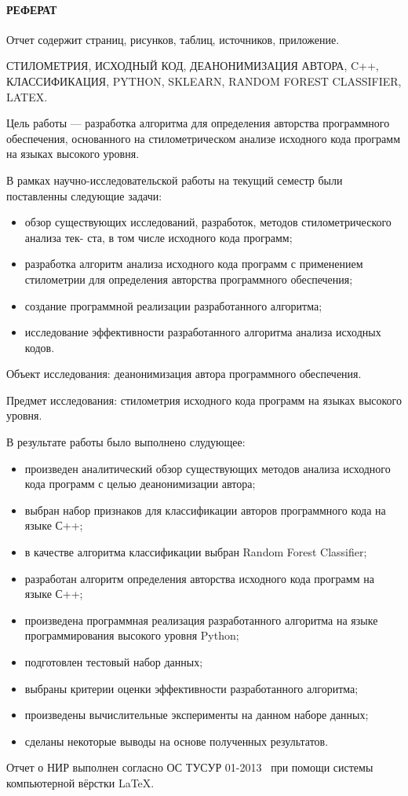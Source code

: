 \newpage
{}
\paragraph{\hfill РЕФЕРАТ \hfill}
Отчет содержит  страниц,  рисунков,  таблиц,  источников,  приложение.

СТИЛОМЕТРИЯ, ИСХОДНЫЙ КОД, ДЕАНОНИМИЗАЦИЯ АВТОРА, C++, КЛАССИФИКАЦИЯ, PYTHON, SKLEARN, RANDOM FOREST CLASSIFIER, LATEX.

Цель работы --- разработка алгоритма для определения авторства программного обеспечения, основанного на стилометрическом анализе исходного кода программ на языках высокого уровня.

В рамках научно-исследовательской работы на текущий семестр были поставленны следующие задачи: 
\begin{itemize}
  \item обзор существующих исследований, разработок, методов стилометрического анализа тек-
ста, в том числе исходного кода программ;
  \item разработка алгоритм анализа исходного кода программ с применением стилометрии для
определения авторства программного обеспечения;
  \item создание программной реализации разработанного алгоритма;
  \item исследование эффективности разработанного алгоритма анализа исходных кодов.
\end{itemize}

Объект исследования: деанонимизация автора программного обеспечения. 

Предмет исследования: стилометрия исходного кода программ на языках высокого уровня.

В результате работы было выполнено слудующее:

\begin{itemize}
  \item произведен аналитический обзор существующих методов анализа исходного кода программ с целью деанонимизации автора;
  \item выбран набор признаков для классификации авторов программного кода на языке С++; 
  \item в качестве алгоритма классификации выбран Random Forest Classifier;
  \item разработан алгоритм определения авторства исходного кода программ на языке С++;
  \item произведена программная реализация разработанного алгоритма на языке программирования высокого уровня Python;
  \item подготовлен тестовый набор данных;
  \item выбраны критерии оценки эффективности разработанного алгоритма;
  \item произведены вычислительные эксперименты на данном наборе данных;
  \item сделаны некоторые выводы на основе полученных результатов.
\end{itemize}

Отчет о НИР выполнен согласно ОС ТУСУР 01-2013~\cite{ostusur} при помощи системы компьютерной вёрстки \LaTeX. 
